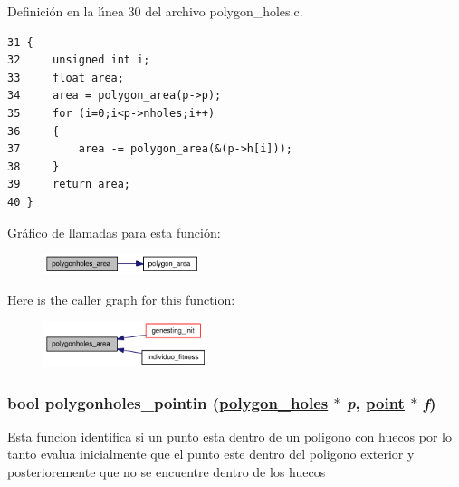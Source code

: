 Definici\'{o}n en la l\'{\i}nea 30 del archivo polygon\_\-holes.c.

\begin{Code}\begin{verbatim}31 {
32     unsigned int i;
33     float area;
34     area = polygon_area(p->p);
35     for (i=0;i<p->nholes;i++)
36     {
37         area -= polygon_area(&(p->h[i]));
38     }
39     return area;
40 }
\end{verbatim}\end{Code}




Gr\'{a}fico de llamadas para esta funci\'{o}n:\begin{figure}[H]
\begin{center}
\leavevmode
\includegraphics[width=130pt]{group__geometry_g380cdcfa6caf51828c8d06f4518a4084_g380cdcfa6caf51828c8d06f4518a4084_cgraph}
\end{center}
\end{figure}


Here is the caller graph for this function:\begin{figure}[H]
\begin{center}
\leavevmode
\includegraphics[width=136pt]{group__geometry_g380cdcfa6caf51828c8d06f4518a4084_g380cdcfa6caf51828c8d06f4518a4084_icgraph}
\end{center}
\end{figure}
\hypertarget{group__geometry_g35a6dd45f6d0cbed26ef8a69ed34a2e9_g35a6dd45f6d0cbed26ef8a69ed34a2e9}{
\subsubsection[polygonholes\_\-pointin]{\setlength{\rightskip}{0pt plus 5cm}bool polygonholes\_\-pointin (\hyperlink{struct__polygon__holes}{polygon\_\-holes} $\ast$ {\em p}, \hyperlink{struct__point}{point} $\ast$ {\em f})}}
\label{group__geometry_g35a6dd45f6d0cbed26ef8a69ed34a2e9_g35a6dd45f6d0cbed26ef8a69ed34a2e9}


Esta funcion identifica si un punto esta dentro de un poligono con huecos por lo tanto evalua inicialmente que el punto este dentro del poligono exterior y posterioremente que no se encuentre dentro de los huecos

